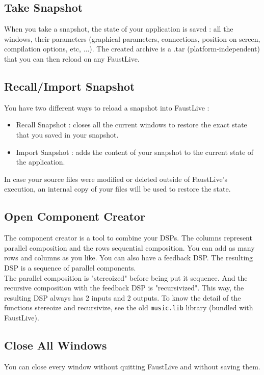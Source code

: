 \documentclass[a4paper]{article}
\begin{document}
\subsection{Take Snapshot}
 When you take a snapshot, the state of your application is saved : all the windows, their parameters (graphical parameters, connections, position on screen, compilation options, etc, ...). The created archive is a .tar (platform-independent) that you can then reload on any FaustLive. 

\subsection{Recall/Import Snapshot}
You have two different ways to reload a snapshot into FaustLive : 
\begin{itemize}
\item Recall Snapshot : closes all the current windows to restore the exact state that you saved in your snapshot.
\item Import Snapshot : adds the content of your snapshot to the current state of the application. 
\end{itemize}

In case your source files were modified or deleted outside of FaustLive's execution, an internal copy of your files will be used to restore the state. 

\subsection{Open Component Creator}
The component creator is a tool to combine your DSPs. The columns represent parallel composition and the rows sequential composition. You can add as many rows and columns as you like. You can also have a feedback DSP. The resulting DSP is a sequence of parallel components. \\

The parallel composition is "stereoized" before being put it sequence. And the recursive composition with the feedback DSP is "recursivized". This way, the resulting DSP always has 2 inputs and 2 outputs. To know the detail of the functions stereoize and recursivize, see the old \texttt{music.lib} library (bundled with FaustLive).


\subsection{Close All Windows}
You can close every window without quitting FaustLive and without saving them.
\end{document}
